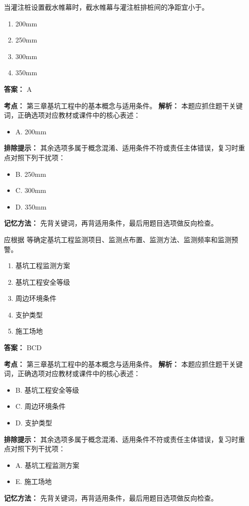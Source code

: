\documentclass[UTF8,fontset=fandol,11pt]{ctexart}
\begin{document}
\begin{quizbox}[title={第 21 题}]
当灌注桩设置截水帷幕时，截水帷幕与灌注桩排桩间的净距宜小于。\\
\begin{enumerate}[label=\Alph*.]
\item 200mm
\item 250mm
\item 300mm
\item 350mm
\end{enumerate}
\textbf{答案：} A
\vspace{0.25em}
\begin{answerbox}[title={考点解析}]
\textbf{考点：} 第三章基坑工程中的基本概念与适用条件。
\textbf{解析：} 本题应抓住题干关键词，正确选项对应教材或课件中的核心表述：
\begin{itemize}
\item A. 200mm
\end{itemize}
\textbf{排除提示：} 其余选项多属于概念混淆、适用条件不符或责任主体错误，复习时重点对照下列干扰项：
\begin{itemize}
\item B. 250mm
\item C. 300mm
\item D. 350mm
\end{itemize}
\textbf{记忆方法：} 先背关键词，再背适用条件，最后用题目选项做反向检查。
\end{answerbox}
\end{quizbox}

\begin{quizbox}[title={第 22 题}]
应根据 等确定基坑工程监测项目、监测点布置、监测方法、监测频率和监测预警。\\
\begin{enumerate}[label=\Alph*.]
\item 基坑工程监测方案
\item 基坑工程安全等级
\item 周边环境条件
\item 支护类型
\item 施工场地
\end{enumerate}
\textbf{答案：} BCD
\vspace{0.25em}
\begin{answerbox}[title={考点解析}]
\textbf{考点：} 第三章基坑工程中的基本概念与适用条件。
\textbf{解析：} 本题应抓住题干关键词，正确选项对应教材或课件中的核心表述：
\begin{itemize}
\item B. 基坑工程安全等级
\item C. 周边环境条件
\item D. 支护类型
\end{itemize}
\textbf{排除提示：} 其余选项多属于概念混淆、适用条件不符或责任主体错误，复习时重点对照下列干扰项：
\begin{itemize}
\item A. 基坑工程监测方案
\item E. 施工场地
\end{itemize}
\textbf{记忆方法：} 先背关键词，再背适用条件，最后用题目选项做反向检查。
\end{answerbox}
\end{quizbox}
\end{document}
